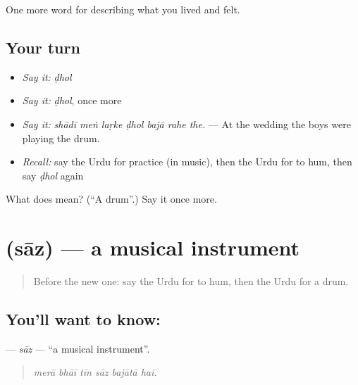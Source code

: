\begin{grammarlens}[title={What you've built}]
One more word for describing what you lived and felt.
\end{grammarlens}

\subsection*{Your turn}
\begin{itemize}
\raggedright
  \item \emph{Say it:} \emph{ḍhol}
  \item \emph{Say it:} \emph{ḍhol}, once more
  \item \emph{Say it:} \emph{shādī meṅ laṛke ḍhol bajā rahe the.} — At the wedding the boys were playing the drum.
  \item \emph{Recall:} say the Urdu for practice (in music), then the Urdu for to hum, then say \emph{ḍhol} again
\end{itemize}

\begin{tcolorbox}[breakable,colback=teal!4,colframe=teal!35!black,title={Before you move on}]
What does  mean? (\textquotedblleft{}A drum\textquotedblright{}.) Say it once more.
\end{tcolorbox}
\section[\texorpdfstring{\ur{ساز} (sāz)}{ساز (sāz)}]{ (sāz) — a musical instrument}

\label{lesson:UR-C519-saz}



\begin{quote}
Before the new one: say the Urdu for to hum, then the Urdu for a drum.
\end{quote}

\subsection*{You'll want to know: }
\textbf{} — \emph{sāz} — \textquotedblleft{}a musical instrument\textquotedblright{}.

\begin{quote}
     
\end{quote}

\begin{quote}
\emph{merā bhāī tīn sāz bajātā hai.}
\end{quote}

